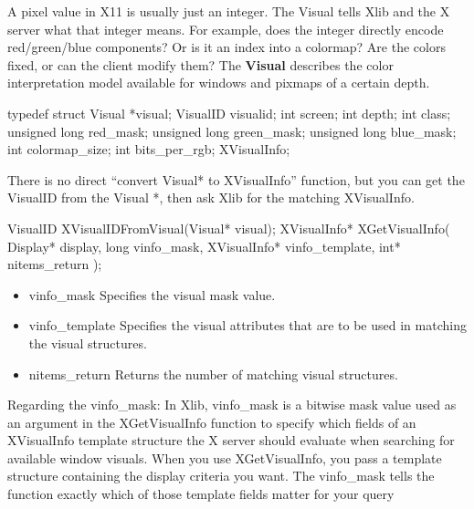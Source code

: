 \documentclass{report}
\begin{document}
\begin{itemize}
            \bigbreak \noindent 
            A pixel value in X11 is usually just an integer. The Visual tells Xlib and the X server what that integer means. For example, does the integer directly encode red/green/blue components? Or is it an index into a colormap? Are the colors fixed, or can the client modify them?
            \bigbreak \noindent 
            The \textbf{Visual} describes the color interpretation model available for windows and pixmaps of a certain depth.
            \bigbreak \noindent 
            \begin{cppcode}
                typedef struct {
                    Visual *visual;
                    VisualID visualid;
                    int screen;
                    int depth;
                    int class;
                    unsigned long red_mask;
                    unsigned long green_mask;
                    unsigned long blue_mask;
                    int colormap_size;
                    int bits_per_rgb;
                } XVisualInfo;
            \end{cppcode}
            \bigbreak \noindent 
            There is no direct “convert Visual* to XVisualInfo” function, but you can get the VisualID from the Visual *, then ask Xlib for the matching XVisualInfo.
            \bigbreak \noindent 
            \begin{cppcode}
                VisualID XVisualIDFromVisual(Visual* visual);
                XVisualInfo* XGetVisualInfo(
                    Display* display,
                    long vinfo_mask,
                    XVisualInfo* vinfo_template,
                    int* nitems_return
                );
            \end{cppcode}
            \begin{itemize}
                \item vinfo\_mask	Specifies the visual mask value.
                \item vinfo\_template	Specifies the visual attributes that are to be used in matching the visual structures.
                \item nitems\_return	Returns the number of matching visual structures.
            \end{itemize}
            Regarding the vinfo\_mask: In Xlib, vinfo\_mask is a bitwise mask value used as an argument in the XGetVisualInfo function to specify which fields of an XVisualInfo template structure the X server should evaluate when searching for available window visuals. When you use XGetVisualInfo, you pass a template structure containing the display criteria you want. The vinfo\_mask tells the function exactly which of those template fields matter for your query

\end{itemize}
\end{document}
